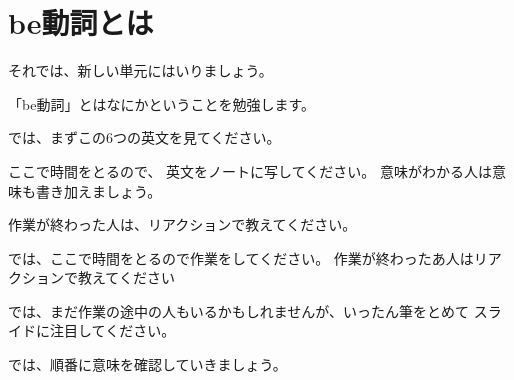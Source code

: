 \documentclass[book,jafontscale=0.9247]{jlreq}
\newcommand{\mySagyo}{%
\par%
\bigskip
では、ここで時間をとるので作業をしてください。
作業が終わったあ人はリアクションで教えてください\par%
\begin{minipage}[t]{.98\textwidth}
\mbox{}\hrulefill\mbox{}\par%
\mbox{}\hfill{}\raisebox{-.5\height}{作業}\hfill\mbox{}\par%
\mbox{}\hrulefill\mbox{}
\end{minipage}%
\par%
\bigskip%
では、まだ作業の途中の人もいるかもしれませんが、いったん筆をとめて
スライドに注目してください。%
\par%
\bigskip
}
\begin{document}
%
%
%
%
%
%
%

%
%
%
%
%
%
%


\section{be動詞とは}
それでは、新しい単元にはいりましょう。

「be動詞」とはなにかということを勉強します。

{\large \ComputerMouse}

では、まずこの6つの英文を見てください。

ここで時間をとるので、
英文をノートに写してください。
意味がわかる人は意味も書き加えましょう。

作業が終わった人は、リアクションで教えてください。

\mySagyo

では、順番に意味を確認していきましょう。
\end{document}
